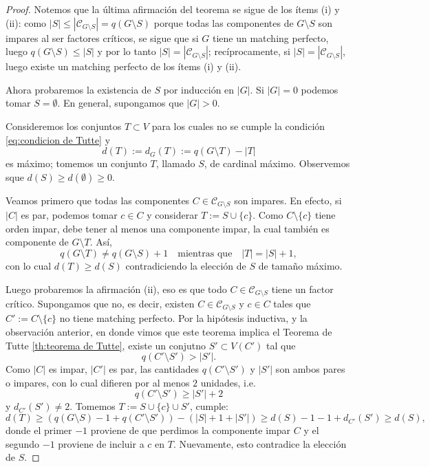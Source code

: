 \documentclass[12pt]{report}
\theoremstyle{plain}
\theoremstyle{definition}
\newcommand{\abs}[1]{\left \vert #1 \right \vert}
\begin{document}
\begin{proof}
Notemos que la última afirmación del teorema se sigue de los ítems (i) y (ii): como $\abs S \leq \abs {\mathcal C _{G \setminus S}} = q(G \setminus S)$ porque todas las componentes de $G\setminus S$ son impares al ser factores críticos, se sigue que si $G$ tiene un matching perfecto, luego $q (G\setminus S) \leq \abs S$ y por lo tanto $\abs S = \abs {\mathcal C _{G\setminus S}}$; recíprocamente, si $\abs S = \abs {\mathcal C _{G \setminus S}}$, luego existe un matching perfecto de los ítems (i) y (ii).

Ahora probaremos la existencia de $S$ por inducción en $\abs G$. Si $\abs G = 0$ podemos tomar $S = \emptyset$. En general, supongamos que $\abs G > 0$.

Consideremos los conjuntos $T \subset V$ para los cuales no se cumple la condición \eqref{eq:condicion de Tutte} y
\[
    d(T) := d_G (T) := q(G \setminus T) - \abs T
\]
es máximo; tomemos un conjunto $T$, llamado $S$, de cardinal máximo. Observemos sque $d(S) \geq d(\emptyset) \geq 0$.

Veamos primero que todas las componentes $C \in \mathcal C_{G \setminus S}$ son impares. En efecto, si $\abs C$ es par, podemos tomar $c \in C$ y considerar $T := S \cup \{c\}$. Como $C \setminus \{c\}$ tiene orden impar, debe tener al menos una componente impar, la cual también es componente de $G \setminus T$. Así,
\[
    q(G\setminus T) \neq q(G \setminus S) + 1 \quad \text{mientras que} \quad \abs T = \abs S + 1,
\]
con lo cual $d(T) \geq d(S)$ contradiciendo la elección de $S$ de tamaño máximo.

Luego probaremos la afirmación (ii), eso es que todo $C \in \mathcal C _{G \setminus S}$ tiene un factor crítico. Supongamos que no, es decir, existen $C\in \mathcal C _{G \setminus S}$ y $c \in C$ tales que $C' := C \setminus \{c\}$ no tiene matching perfecto. Por la hipótesis inductiva, y la observación anterior, en donde vimos que este teorema implica el Teorema de Tutte \ref{th:teorema de Tutte}, existe un conjutno $S' \subset V(C')$ tal que
\[
    q(C' \setminus S') > \abs {S'}.
\]
Como $\abs C$ es impar, $\abs{C'}$ es par, las cantidades $q(C' \setminus S')$ y $\abs{S'}$ son ambos pares o impares, con lo cual difieren por al menos $2$ unidades, i.e.
\[
    q(C' \setminus S') \geq \abs {S'} + 2
\]
y $d_{C'} (S') \neq 2$. Tomemos $T := S \cup \{c\} \cup S'$, cumple:
\[
    d(T) \geq (q(G \setminus S) - 1 + q(C' \setminus S')) - (\abs S + 1 + \abs{S'})  \geq d(S) - 1 - 1 + d_{C'} (S') \geq d(S),
\]
donde el primer $-1$ proviene de que perdimos la componente impar $C$ y el segundo $-1$ proviene de incluir a $c$ en $T$. Nuevamente, esto contradice la elección de $S$.


\end{proof}
\end{document}
